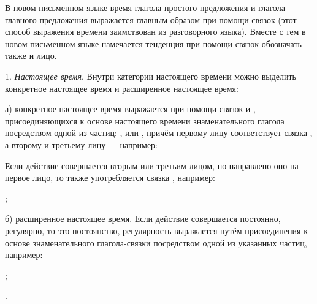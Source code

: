 В новом письменном языке время глагола простого предложения и глагола главного предложения выражается главным образом при помощи связок (этот способ выражения времени заимствован из разговорного языка). Вместе с тем в новом письменном языке намечается тенденция при помощи связок обозначать также и лицо.

1. \emph{Настоящее время}. Внутри категории настоящего времени можно выделить конкретное настоящее время и расширенное настоящее время:

а) конкретное настоящее время выражается при помощи связок  и , присоединяющихся к основе настоящего времени знаменательного глагола посредством одной из частиц: ,  или , причём первому лицу соответствует связка , а второму и третьему лицу ---  например:
\begin{prfsample}
	\item {}
	\item {}
	\item {}
\end{prfsample}

Если действие совершается вторым или третьим лицом, но направлено оно на первое лицо, то также употребляется связка , например:
\begin{prfsample}
	\item {};
\end{prfsample}

б) расширенное настоящее время. Если действие совершается постоянно, регулярно, то это постоянство, регулярность выражается путём присоединения к основе знаменательного глагола-связки  посредством одной из указанных частиц, например:
\begin{prfsample}
	\item {};
	\item {}.
\end{prfsample}

